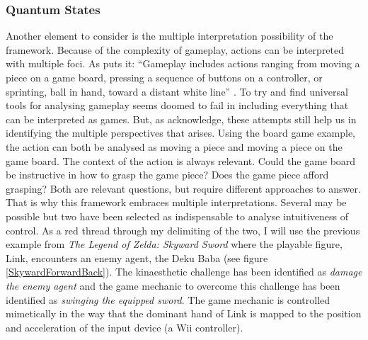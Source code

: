\subsubsection{Quantum States}
Another element to consider is the multiple interpretation possibility of the framework. Because of the complexity of gameplay, actions can be interpreted with multiple foci. As  puts it: ``Gameplay includes actions ranging from moving a piece on a game board, pressing a sequence of buttons on a controller, or sprinting, ball in hand, toward a distant white line'' \cite[p. 8]{calleja}. To try and find universal tools for analysing gameplay seems doomed to fail in including everything that can be interpreted as games. But, as \cite{calleja} acknowledge, these attempts still help us in identifying the multiple perspectives that arises. Using the board game example, the action can both be analysed as moving a piece and moving a piece on the game board. The context of the action is always relevant. Could the game board be instructive in how to grasp the game piece? Does the game piece afford grasping? Both are relevant questions, but require different approaches to answer. That is why this framework embraces multiple interpretations. Several may be possible but two have been selected as indispensable to analyse intuitiveness of control. As a red thread through my delimiting of the two, I will use the previous example from \textit{The Legend of Zelda: Skyward Sword} \cite{skyward} where the playable figure, Link, encounters an enemy agent, the Deku Baba (see figure \ref{SkywardForwardBack}). The kinaesthetic challenge has been identified as \textit{damage the enemy agent} and the game mechanic to overcome this challenge has been identified as \textit{swinging the equipped sword}. The game mechanic is controlled mimetically in the way that the dominant hand of Link is mapped to the position and acceleration of the input device (a Wii controller).

